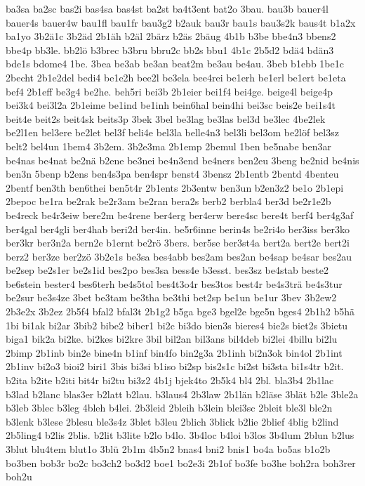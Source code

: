 {ba3sa
ba2sc
bas2i
bas4sa
bas4st
ba2st
ba4t3ent
bat2o
3bau.
bau3b
bauer4l
bauer4s
bauer4w
bau1fl
bau1fr
bau3g2
b2auk
bau3r
bau1s
bau3s2k
baus4t
b1a2x
ba1yo
3b2ä1c
3b2äd
2b1äh
b2äl
2bärz
b2äs
2bäug
4b1b
b3be
bbe4n3
bbens2
bbe4p
bb3le.
bb2lö
b3brec
b3bru
bbru2c
bb2s
bbu1
4b1c
2b5d2
bdä4
bdän3
bde1s
bdome4
1be.
3bea
be3ab
be3an
beat2m
be3au
be4au.
3beb
b1ebb
1be1c
2becht
2b1e2del
bedi4
be1e2h
bee2l
be3ela
bee4rei
be1erh
be1erl
be1ert
be1eta
bef4
2b1eff
be3g4
be2he.
beh5ri
bei3b
2b1eier
bei1f4
bei4ge.
beige4l
beige4p
bei3k4
bei3l2a
2b1eime
be1ind
be1inh
bein6hal
bein4hi
bei3sc
beis2e
bei1s4t
beit4e
beit2s
beit4sk
beits3p
3bek
3bel
be3lag
be3las
bel3d
be3lec
4be2lek
be2l1en
bel3ere
be2let
bel3f
beli4e
bel3la
belle4n3
bel3li
bel3om
be2löf
bel3sz
belt2
bel4un
1bem4
3b2em.
3b2e3ma
2b1emp
2bemul
1ben
be5nabe
ben3ar
be4nas
be4nat
be2nä
b2ene
be3nei
be4n3end
be4ners
ben2eu
3beng
be2nid
be4nis
ben3n
5benp
b2ens
ben4s3pa
ben4spr
benst4
3bensz
2b1entb
2bentd
4benteu
2bentf
ben3th
ben6thei
ben5t4r
2b1ents
2b3entw
ben3un
b2en3z2
be1o
2b1epi
2bepoc
be1ra
be2rak
be2r3am
be2ran
bera2s
berb2
berbla4
ber3d
be2r1e2b
be4reck
be4r3eiw
bere2m
be4rene
ber4erg
ber4erw
bere4sc
bere4t
berf4
ber4g3af
ber4gal
ber4gli
ber4hab
beri2d
ber4in.
be5r6inne
berin4s
be2ri4o
ber3iss
ber3ko
ber3kr
ber3n2a
bern2e
b1ernt
be2rö
3bers.
ber5se
ber3st4a
bert2a
bert2e
bert2i
berz2
ber3ze
ber2zö
3b2e1s
be3sa
bes4abb
bes2am
bes2an
be4sap
be4sar
bes2au
be2sep
be2s1er
be2s1id
bes2po
bes3sa
bess4e
b3esst.
bes3sz
be4stab
beste2
be6stein
bester4
bes6terh
be4s5tol
bes4t3o4r
bes3tos
best4r
be4s3trä
be4s3tur
be2sur
be3s4ze
3bet
be3tam
be3tha
be3thi
bet2sp
be1un
be1ur
3bev
3b2ew2
2b3e2x
3b2ez
2b5f4
bfal2
bfal3t
2b1g2
b5ga
bge3
bgel2e
bge5n
bges4
2b1h2
b5hä
1bi
bi1ak
bi2ar
3bib2
bibe2
biber1
bi2c
bi3do
bien3s
bieres4
bie2s
biet2s
3bietu
biga1
bik2a
bi2ke.
bi2kes
bi2kre
3bil
bil2an
bil3ans
bil4deb
bi2lei
4billu
bi2lu
2bimp
2b1inb
bin2e
bine4n
b1inf
bin4fo
bin2g3a
2b1inh
bi2n3ok
bin4ol
2b1int
2b1inv
bi2o3
bioi2
biri1
3bis
bi3si
b1iso
bi2sp
bis2s1c
bi2st
bi3sta
bi1s4tr
b2it.
b2ita
b2ite
b2iti
bit4r
bi2tu
bi3z2
4b1j
bjek4to
2b5k4
bl4
2bl.
bla3b4
2b1lac
b3lad
b2lanc
blas3er
b2latt
b2lau.
b3laus4
2b3law
2b1län
b2läse
3blät
b2le
3ble2a
b3leb
3blec
b3leg
4bleh
b4lei.
2b3leid
2bleih
b3lein
blei3sc
2bleit
ble3l
ble2n
b3lenk
b3lese
2blesu
ble3s4z
3blet
b3leu
2blich
3blick
b2lie
2blief
4blig
b2lind
2b5ling4
b2lis
2blis.
b2lit
b3lite
b2lo
b4lo.
3b4loc
b4loi
b3los
3b4lum
2blun
b2lus
3blut
blu4tem
blut1o
3blü
2b1m
4b5n2
bnas4
bni2
bnis1
bo4a
bo5as
b1o2b
bo3ben
bob3r
bo2c
bo3ch2
bo3d2
boe1
bo2e3i
2b1of
bo3fe
bo3he
boh2ra
boh3rer
boh2u
}
